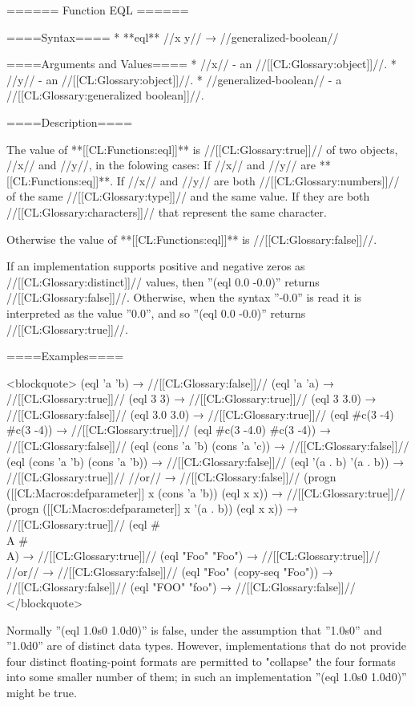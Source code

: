 ====== Function EQL ======

====Syntax====
  * **eql** //x y// → //generalized-boolean//

====Arguments and Values====
  * //x// - an //[[CL:Glossary:object]]//.
  * //y// - an //[[CL:Glossary:object]]//.
  * //generalized-boolean// - a //[[CL:Glossary:generalized boolean]]//.

====Description====

The value of **[[CL:Functions:eql]]** is //[[CL:Glossary:true]]// of two objects, //x// and //y//, in the folowing cases: \beginlist {} If //x// and //y// are **[[CL:Functions:eq]]**.  If //x// and //y// are both //[[CL:Glossary:numbers]]// of the same //[[CL:Glossary:type]]// and the same value.  If they are both //[[CL:Glossary:characters]]// that represent the same character. \endlist

Otherwise the value of **[[CL:Functions:eql]]** is //[[CL:Glossary:false]]//.

If an implementation supports positive and negative zeros as //[[CL:Glossary:distinct]]// values, then ''(eql 0.0 -0.0)'' returns //[[CL:Glossary:false]]//. Otherwise, when the syntax ''-0.0'' is read it is interpreted as the value ''0.0'', and so ''(eql 0.0 -0.0)'' returns //[[CL:Glossary:true]]//.

====Examples====

<blockquote> (eql 'a 'b) → //[[CL:Glossary:false]]// (eql 'a 'a) → //[[CL:Glossary:true]]// (eql 3 3) → //[[CL:Glossary:true]]// (eql 3 3.0) → //[[CL:Glossary:false]]// (eql 3.0 3.0) → //[[CL:Glossary:true]]// (eql #c(3 -4) #c(3 -4)) → //[[CL:Glossary:true]]// (eql #c(3 -4.0) #c(3 -4)) → //[[CL:Glossary:false]]// (eql (cons 'a 'b) (cons 'a 'c)) → //[[CL:Glossary:false]]// (eql (cons 'a 'b) (cons 'a 'b)) → //[[CL:Glossary:false]]// (eql '(a . b) '(a . b)) → //[[CL:Glossary:true]]// //or// → //[[CL:Glossary:false]]// (progn ([[CL:Macros:defparameter]] x (cons 'a 'b)) (eql x x)) → //[[CL:Glossary:true]]// (progn ([[CL:Macros:defparameter]] x '(a . b)) (eql x x)) → //[[CL:Glossary:true]]// (eql #\\A #\\A) → //[[CL:Glossary:true]]// (eql "Foo" "Foo") → //[[CL:Glossary:true]]// //or// → //[[CL:Glossary:false]]// (eql "Foo" (copy-seq "Foo")) → //[[CL:Glossary:false]]// (eql "FOO" "foo") → //[[CL:Glossary:false]]// </blockquote>

Normally ''(eql 1.0s0 1.0d0)'' is false, under the assumption that ''1.0s0'' and ''1.0d0'' are of distinct data types. However, implementations that do not provide four distinct floating-point formats are permitted to "collapse" the four formats into some smaller number of them; in such an implementation ''(eql 1.0s0 1.0d0)'' might be true.

